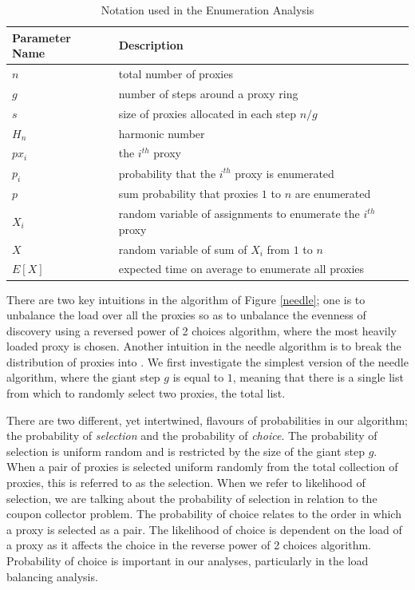 \begin{table}[h]
  \centering
	\begin{tabular}{ll}
	\hline
	\cline{1-2}
	Parameter Name    & Description  \\
	\hline
    $n$     & total number of proxies \\
	$g$     & number of steps around a proxy ring  \\
	$s$     & size of proxies allocated in each step $n/g$ \\
    $H_n$   & harmonic number \\
    $px_i$  & the $i^{th}$ proxy \\
    $p_i$   & probability that the $i^{th}$ proxy is enumerated \\
    $p$     & sum probability that proxies $1$ to $n$ are enumerated \\
    $X_i$   & random variable of assignments to enumerate the $i^{th}$ proxy \\
    $X$     & random variable of sum of $X_i$ from $1$ to $n$ \\
    $E[X]$  & expected time on average to enumerate all proxies \\
	\hline
	\end{tabular}
  \caption{Notation used in the Enumeration Analysis}
  \label{tab:vars}
\end{table}

There are two key intuitions in the  algorithm of Figure \ref{needle}; one is to unbalance the load over all the proxies so as to unbalance the evenness of discovery using a reversed power of 2 choices algorithm, where the most heavily loaded proxy is chosen. Another intuition in the needle algorithm is to break the distribution of proxies into . We first investigate the simplest version of the needle algorithm, where the giant step $g$ is equal to $1$, meaning that there is a single list from which to randomly select two proxies, the total list.

There are two different, yet intertwined, flavours of probabilities in our algorithm; the probability of \textit{selection} and the probability of \textit{choice}. The probability of selection is uniform random and is restricted by the size of the giant step $g$. When a pair of proxies is selected uniform randomly from the total collection of proxies, this is referred to as the selection. When we refer to likelihood of selection, we are talking about the probability of selection in relation to the coupon collector problem. The probability of choice relates to the order in which a proxy is selected as a pair.  The likelihood of choice is dependent on the load of a proxy as it affects the choice in the reverse power of 2 choices algorithm. Probability of choice is important in our analyses, particularly in the load balancing analysis.

